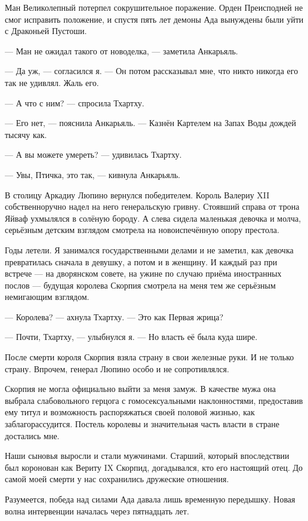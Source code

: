 Ман Великолепный потерпел сокрушительное поражение.
Орден Преисподней не смог исправить положение, и спустя пять лет демоны Ада вынуждены были уйти с Драконьей Пустоши.

--- Ман не ожидал такого от новоделка, --- заметила Анкарьяль.

--- Да уж, --- согласился я.
--- Он потом рассказывал мне, что никто никогда его так не удивлял.
Жаль его.

--- А что с ним? --- спросила Тхартху.

--- Его нет, --- пояснила Анкарьяль.
--- Казнён Картелем на Запах Воды дождей тысячу как.

--- А вы можете умереть? --- удивилась Тхартху.

--- Увы, Птичка, это так, --- кивнула Анкарьяль.

В столицу Аркадиу Люпино вернулся победителем.
Король Валериу XII собственноручно надел на него генеральскую гривну.
Стоявший справа от трона Яйваф ухмылялся в солёную бороду.
А слева сидела маленькая девочка и молча, серьёзным детским взглядом смотрела на новоиспечённую опору престола.

Годы летели.
Я занимался государственными делами и не заметил, как девочка превратилась сначала в девушку, а потом и в женщину.
И каждый раз при встрече --- на дворянском совете, на ужине по случаю приёма иностранных послов --- будущая королева Скорпия смотрела на меня тем же серьёзным немигающим взглядом.

--- Королева? --- ахнула Тхартху.
--- Это как Первая жрица?

--- Почти, Тхартху, --- улыбнулся я.
--- Но власть её была куда шире.

После смерти короля Скорпия взяла страну в свои железные руки.
И не только страну.
Впрочем, генерал Люпино особо и не сопротивлялся.

Скорпия не могла официально выйти за меня замуж.
В качестве мужа она выбрала слабовольного герцога с гомосексуальными наклонностями, предоставив ему титул и возможность распоряжаться своей половой жизнью, как заблагорассудится.
Постель королевы и значительная часть власти в стране достались мне.

Наши сыновья выросли и стали мужчинами.
Старший, который впоследствии был коронован как Вериту IX Скорпид, догадывался, кто его настоящий отец.
До самой моей смерти у нас сохранились дружеские отношения.

Разумеется, победа над силами Ада давала лишь временную передышку.
Новая волна интервенции началась через пятнадцать лет.


